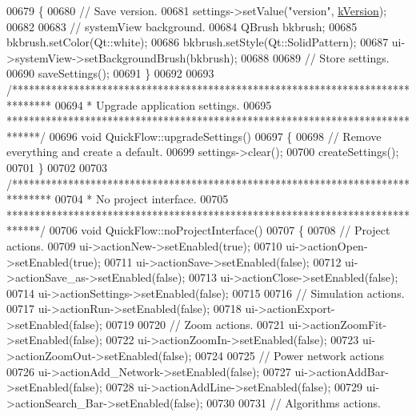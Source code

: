 \begin{DoxyCode}
00679 \{
00680   \textcolor{comment}{// Save version.}
00681   settings->setValue(\textcolor{stringliteral}{"version"}, \hyperlink{group___window_gabfc3b1280bdae9a9c046d56b1459ab99}{kVersion});
00682 
00683 \textcolor{comment}{//  systemView background.}
00684   QBrush bkbrush;
00685   bkbrush.setColor(Qt::white);
00686   bkbrush.setStyle(Qt::SolidPattern);
00687   ui->systemView->setBackgroundBrush(bkbrush);
00688 
00689   \textcolor{comment}{// Store settings.}
00690   saveSettings();
00691 \}
00692 
00693 \textcolor{comment}{/*******************************************************************************}
00694 \textcolor{comment}{ * Upgrade application settings.}
00695 \textcolor{comment}{ ******************************************************************************/}
00696 \textcolor{keywordtype}{void} QuickFlow::upgradeSettings()
00697 \{
00698   \textcolor{comment}{// Remove everything and create a default.}
00699   settings->clear();
00700   createSettings();
00701 \}
00702 
00703 \textcolor{comment}{/*******************************************************************************}
00704 \textcolor{comment}{ * No project interface.}
00705 \textcolor{comment}{ ******************************************************************************/}
00706 \textcolor{keywordtype}{void} QuickFlow::noProjectInterface()
00707 \{
00708   \textcolor{comment}{// Project actions.}
00709   ui->actionNew->setEnabled(\textcolor{keyword}{true});
00710   ui->actionOpen->setEnabled(\textcolor{keyword}{true});
00711   ui->actionSave->setEnabled(\textcolor{keyword}{false});
00712   ui->actionSave\_as->setEnabled(\textcolor{keyword}{false});
00713   ui->actionClose->setEnabled(\textcolor{keyword}{false});
00714   ui->actionSettings->setEnabled(\textcolor{keyword}{false});
00715 
00716   \textcolor{comment}{// Simulation actions.}
00717   ui->actionRun->setEnabled(\textcolor{keyword}{false});
00718   ui->actionExport->setEnabled(\textcolor{keyword}{false});
00719 
00720   \textcolor{comment}{// Zoom actions.}
00721   ui->actionZoomFit->setEnabled(\textcolor{keyword}{false});
00722   ui->actionZoomIn->setEnabled(\textcolor{keyword}{false});
00723   ui->actionZoomOut->setEnabled(\textcolor{keyword}{false});
00724 
00725   \textcolor{comment}{// Power network actions}
00726   ui->actionAdd\_Network->setEnabled(\textcolor{keyword}{false});
00727   ui->actionAddBar->setEnabled(\textcolor{keyword}{false});
00728   ui->actionAddLine->setEnabled(\textcolor{keyword}{false});
00729   ui->actionSearch\_Bar->setEnabled(\textcolor{keyword}{false});
00730 
00731   \textcolor{comment}{// Algorithms actions.}

\end{DoxyCode}

